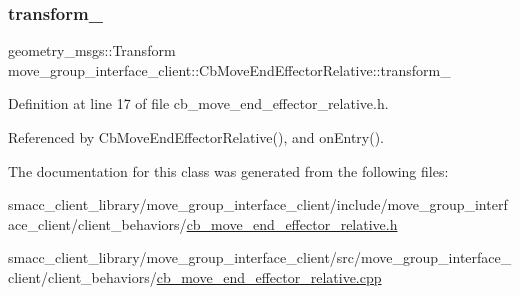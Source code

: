 \subsubsection{\texorpdfstring{transform\+\_\+}{transform\_}}
{\footnotesize\ttfamily geometry\+\_\+msgs\+::\+Transform move\+\_\+group\+\_\+interface\+\_\+client\+::\+Cb\+Move\+End\+Effector\+Relative\+::transform\+\_\+}



Definition at line 17 of file cb\+\_\+move\+\_\+end\+\_\+effector\+\_\+relative.\+h.



Referenced by Cb\+Move\+End\+Effector\+Relative(), and on\+Entry().



The documentation for this class was generated from the following files\+:\begin{DoxyCompactItemize}
\item 
smacc\+\_\+client\+\_\+library/move\+\_\+group\+\_\+interface\+\_\+client/include/move\+\_\+group\+\_\+interface\+\_\+client/client\+\_\+behaviors/\hyperlink{cb__move__end__effector__relative_8h}{cb\+\_\+move\+\_\+end\+\_\+effector\+\_\+relative.\+h}\item 
smacc\+\_\+client\+\_\+library/move\+\_\+group\+\_\+interface\+\_\+client/src/move\+\_\+group\+\_\+interface\+\_\+client/client\+\_\+behaviors/\hyperlink{cb__move__end__effector__relative_8cpp}{cb\+\_\+move\+\_\+end\+\_\+effector\+\_\+relative.\+cpp}\end{DoxyCompactItemize}
